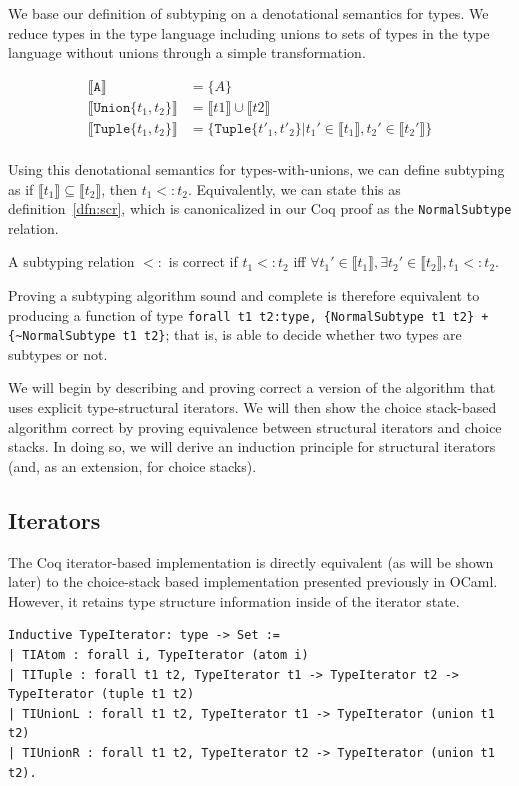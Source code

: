 \documentclass[a4paper,english]{lipics-v2019}
\newcommand{\xt}[1]{\texttt{#1}}
\newcommand{\tuplet}[2]{\xt{Tuple\{}#1,#2\xt{\}}}
\newcommand{\union}[2]{\xt{Union\{}#1,#2\xt{\}}}
\newcommand{\denotes}[1]{\llbracket #1 \rrbracket}
\begin{document}
We base our definition of subtyping on a denotational semantics for types. 
We reduce types in the type language including unions to sets of types
in the type language without unions through a simple transformation. 

\begin{align*}
\denotes{\xt{A}} &= \{A\} \\
\denotes{\union{t_1}{t_2}} &= \denotes{t1} \cup \denotes{t2} \\
\denotes{\tuplet{t_1}{t_2}} &= \{\tuplet{t'_1}{t'_2} | t_1' \in \denotes{t_1},  t_2' \in \denotes{t_2'}\} \\
\end{align*}

Using this denotational semantics for types-with-unions, we can define
subtyping as if $\denotes{t_1} \subseteq \denotes{t_2}$, then $t_1 <: t_2$.
Equivalently, we can state this as definition~\ref{dfn:scr}, which is canonicalized
in our Coq proof as the \verb|NormalSubtype| relation.

\begin{definition}
A subtyping relation $<:$ is correct if $t_1 <: t_2$ iff $\forall t_1' \in \denotes{t_1},
\exists t_2' \in \denotes{t_2}, t_1 <: t_2$.
\label{dfn:scr}
\end{definition}

Proving a subtyping algorithm sound and complete is therefore equivalent to
producing a function of type \verb|forall t1 t2:type, {NormalSubtype t1 t2} + {~NormalSubtype t1 t2}|; that is, is able to decide whether two types are
subtypes or not.

We will begin by describing and proving correct a version of the algorithm
that uses explicit type-structural iterators. We will then show the choice
stack-based algorithm correct by proving equivalence between structural
iterators and choice stacks. In doing so, we will derive an induction
principle for structural iterators (and, as an extension, for choice stacks).

\subsection{Iterators}

The Coq iterator-based implementation is directly equivalent (as will be shown
later) to the choice-stack based implementation presented previously in OCaml.
However, it retains type structure information inside of the iterator state.

\begin{small}\begin{verbatim}
Inductive TypeIterator: type -> Set :=
| TIAtom : forall i, TypeIterator (atom i)
| TITuple : forall t1 t2, TypeIterator t1 -> TypeIterator t2 -> TypeIterator (tuple t1 t2)
| TIUnionL : forall t1 t2, TypeIterator t1 -> TypeIterator (union t1 t2)
| TIUnionR : forall t1 t2, TypeIterator t2 -> TypeIterator (union t1 t2).
\end{verbatim}\end{small}
\end{document}
